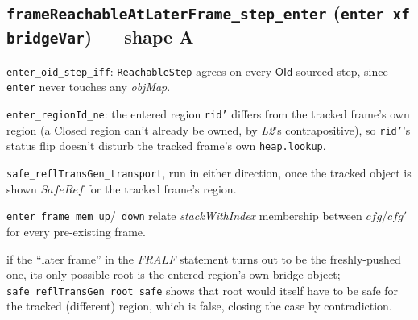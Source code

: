 \documentclass[11pt]{article}
\newcommand{\op}[1]{\texttt{#1}}
\newcommand{\thm}[1]{\textbf{\texttt{#1}}}
\begin{document}
\subsection{\thm{frameReachableAtLaterFrame\_step\_enter} (\op{enter xf bridgeVar}) --- shape A}
\begin{description}[nosep]
  \item[Step relation] \texttt{enter\_oid\_step\_iff}: \texttt{ReachableStep} agrees on every
    $\mathsf{OId}$-sourced step, since \op{enter} never touches any \textit{objMap}.
  \item[Distinctness] \texttt{enter\_regionId\_ne}: the entered region \op{rid'} differs from the
    tracked frame's own region (a Closed region can't already be owned, by \textit{L2}'s
    contrapositive), so \op{rid'}'s status flip doesn't disturb the tracked frame's own
    \texttt{heap.lookup}.
  \item[Transport] \texttt{safe\_reflTransGen\_transport}, run in either direction, once the
    tracked object is shown $\mathit{SafeRef}$ for the tracked frame's region.
  \item[Frame bookkeeping] \texttt{enter\_frame\_mem\_up}/\texttt{\_down} relate
    \textit{stackWithIndex} membership between $cfg$/$cfg'$ for every pre-existing frame.
  \item[The one wrinkle] if the ``later frame'' in the \textit{FRALF} statement turns out to be the
    freshly-pushed one, its only possible root is the entered region's own bridge object;
    \texttt{safe\_reflTransGen\_root\_safe} shows that root would itself have to be safe for the
    tracked (different) region, which is false, closing the case by contradiction.
\end{description}
\end{document}
